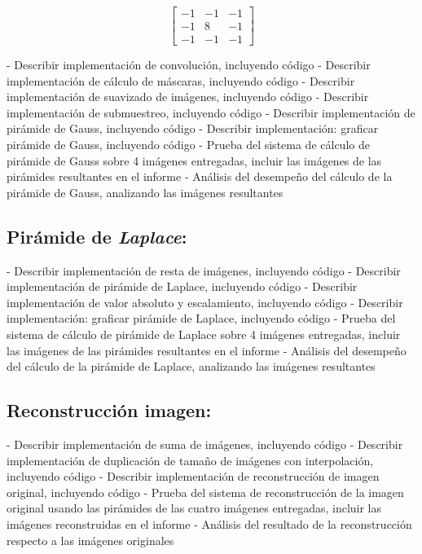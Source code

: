 \documentclass[12pt, letterpaper]{article}
\begin{document}
\begin{equation}
\begin{bmatrix}
-1 & -1 & -1 \\ 
-1 & 8 & -1 \\ 
-1 & -1 & -1
\end{bmatrix}
\end{equation}


\bigskip
- Describir implementación de convolución, incluyendo código
- Describir implementación de cálculo de máscaras, incluyendo código
- Describir implementación de suavizado de imágenes, incluyendo código
- Describir implementación de submuestreo, incluyendo código
- Describir implementación de pirámide de Gauss, incluyendo código
- Describir implementación: graficar pirámide de Gauss, incluyendo código
- Prueba del sistema de cálculo de pirámide de Gauss sobre 4 imágenes entregadas, incluir las
imágenes de las pirámides resultantes en el informe
- Análisis del desempeño del cálculo de la pirámide de Gauss, analizando las imágenes resultantes


\subsection{Pirámide de \textit{Laplace}:}
- Describir implementación de resta de imágenes, incluyendo código
- Describir implementación de pirámide de Laplace, incluyendo código
- Describir implementación de valor absoluto y escalamiento, incluyendo código
- Describir implementación: graficar pirámide de Laplace, incluyendo código
- Prueba del sistema de cálculo de pirámide de Laplace sobre 4 imágenes entregadas, incluir las
imágenes de las pirámides resultantes en el informe
- Análisis del desempeño del cálculo de la pirámide de Laplace, analizando las imágenes resultantes


\subsection{Reconstrucción imagen:}
- Describir implementación de suma de imágenes, incluyendo código
- Describir implementación de duplicación de tamaño de imágenes con interpolación, incluyendo
código
- Describir implementación de reconstrucción de imagen original, incluyendo código
- Prueba del sistema de reconstrucción de la imagen original usando las pirámides de las cuatro
imágenes entregadas, incluir las imágenes reconstruidas en el informe
- Análisis del resultado de la reconstrucción respecto a las imágenes originales
\end{document}
